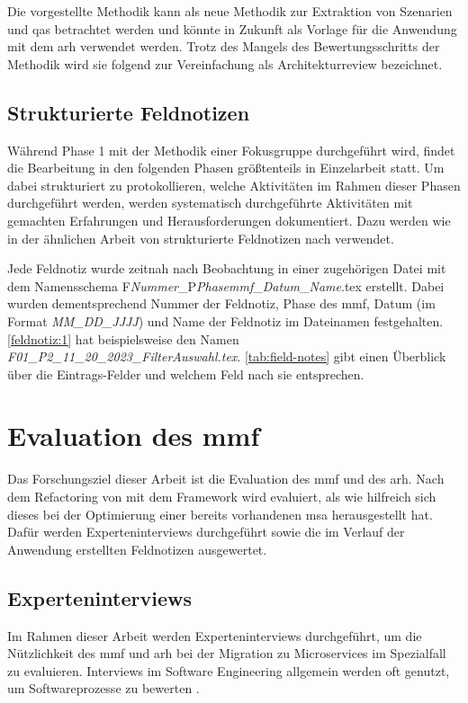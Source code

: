 Die vorgestellte Methodik kann als neue Methodik zur Extraktion von Szenarien und \glspl{qa} betrachtet werden und könnte in Zukunft als Vorlage für die Anwendung mit dem \gls{arh} verwendet werden.
Trotz des Mangels des Bewertungsschritts der Methodik wird sie folgend zur Vereinfachung als Architekturreview bezeichnet.

\subsection{Strukturierte Feldnotizen}
\label{sec:structured-field-notes}
Während Phase 1 mit der Methodik einer Fokusgruppe durchgeführt wird, findet die Bearbeitung in den folgenden Phasen größtenteils in Einzelarbeit statt.
Um dabei strukturiert zu protokollieren, welche Aktivitäten im Rahmen dieser Phasen durchgeführt werden, werden systematisch durchgeführte Aktivitäten mit gemachten Erfahrungen und Herausforderungen dokumentiert. %
Dazu werden wie in der ähnlichen Arbeit von  strukturierte Feldnotizen nach  verwendet.

Jede Feldnotiz wurde zeitnah nach Beobachtung in einer zugehörigen Datei mit dem Namensschema F\emph{Nummer}\_P\emph{Phase\gls{mmf}}\_\emph{Datum}\_\emph{Name}.tex erstellt.
Dabei wurden dementsprechend Nummer der Feldnotiz, Phase des \gls{mmf}, Datum (im Format \emph{MM\_DD\_JJJJ}) und Name der Feldnotiz im Dateinamen festgehalten.
\cref{feldnotiz:1} hat beispielsweise den Namen \emph{F01\_P2\_11\_20\_2023\_FilterAuswahl.tex}.
\cref{tab:field-notes} gibt einen Überblick über die Eintrags-Felder und welchem Feld nach  sie entsprechen.



\section{Evaluation des \gls{mmf}}

Das Forschungsziel dieser Arbeit ist die Evaluation des \gls{mmf} und des \gls{arh}.
Nach dem Refactoring von \jf mit dem Framework wird evaluiert, als wie hilfreich sich dieses bei der Optimierung einer bereits vorhandenen \gls{msa} herausgestellt hat.
Dafür werden Experteninterviews durchgeführt sowie die im Verlauf der Anwendung erstellten Feldnotizen ausgewertet.

\subsection{Experteninterviews}
\label{sec:methodik-interviews}
Im Rahmen dieser Arbeit werden Experteninterviews durchgeführt, um die Nützlichkeit des \gls{mmf} und \gls{arh} bei der Migration zu Microservices im Spezialfall \jf zu evaluieren.
Interviews im Software Engineering allgemein werden oft genutzt, um Softwareprozesse zu bewerten \cite{seaman2008qualitative}.

